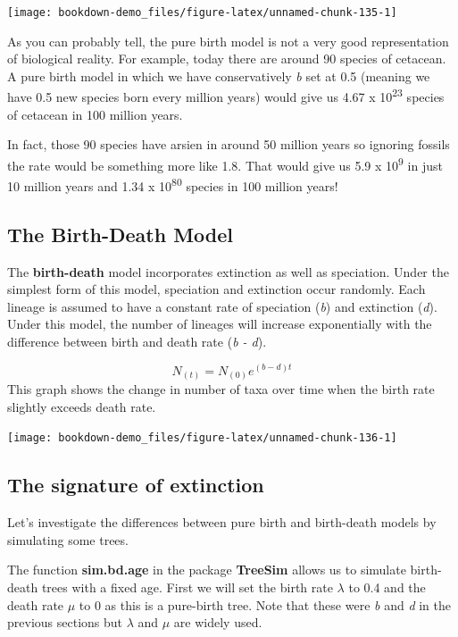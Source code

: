 \documentclass[
]{book}
\begin{document}
\begin{center}\texttt{[image: bookdown-demo\_files/figure-latex/unnamed-chunk-135-1]} \end{center}

As you can probably tell, the pure birth model is not a very good representation of biological reality. For example, today there are around 90 species of cetacean. A pure birth model in which we have conservatively \emph{b} set at 0.5 (meaning we have 0.5 new species born every million years) would give us 4.67 x 10\textsuperscript{23} species of cetacean in 100 million years.

In fact, those 90 species have arsien in around 50 million years so ignoring fossils the rate would be something more like 1.8. That would give us 5.9 x 10\textsuperscript{9} in just 10 million years and 1.34 x 10\textsuperscript{80} species in 100 million years!

\hypertarget{the-birth-death-model}{%
\subsection{The Birth-Death Model}\label{the-birth-death-model}}

The \textbf{birth-death} model incorporates extinction as well as speciation. Under the simplest form of this model, speciation and extinction occur randomly. Each lineage is assumed to have a constant rate of speciation (\emph{b}) and extinction (\emph{d}). Under this model, the number of lineages will increase exponentially with the difference between birth and death rate (\emph{b - d}).

\[ N_{(t)} = N_{(0)}e^{(b-d)t} \]
This graph shows the change in number of taxa over time when the birth rate slightly exceeds death rate.

\begin{center}\texttt{[image: bookdown-demo\_files/figure-latex/unnamed-chunk-136-1]} \end{center}

\hypertarget{the-signature-of-extinction}{%
\subsection{The signature of extinction}\label{the-signature-of-extinction}}

Let's investigate the differences between pure birth and birth-death models by simulating some trees.

The function \textbf{sim.bd.age} in the package \textbf{TreeSim} \citep{treesim} allows us to simulate birth-death trees with a fixed age. First we will set the birth rate \(\lambda\) to 0.4 and the death rate \(\mu\) to 0 as this is a pure-birth tree. Note that these were \emph{b} and \emph{d} in the previous sections but \(\lambda\) and \(\mu\) are widely used.
\end{document}
